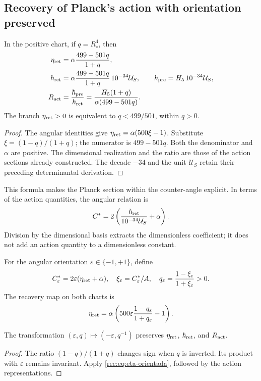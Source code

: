 \subsection{Recovery of Planck's action with orientation preserved}

\begin{theorem}
\label{rec:thm:accion}
In the positive chart, if \(q=R_\star^4\), then
\begin{align}
 \eta_{\rm ret}&=\alpha\frac{499-501q}{1+q},\label{rec:eq:eta-radio}\\
 \hbar_{\rm ret}&=\alpha\frac{499-501q}{1+q}\,10^{-34}\mathcal U_S,
 \qquad\hbar_{\rm pre}=H_5\,10^{-34}\mathcal U_S,\label{rec:eq:planck-radio}\\
 R_{\rm act}&=\frac{\hbar_{\rm pre}}{\hbar_{\rm ret}}
 =\frac{H_5(1+q)}{\alpha(499-501q)}.\label{rec:eq:ratio-radio}
\end{align}
The branch \(\eta_{\rm ret}>0\) is equivalent to \(q<499/501\), within \(q>0\).
\end{theorem}
\begin{proof}
The angular identities give \(\eta_{\rm ret}=\alpha(500\xi-1)\). Substitute \(\xi=(1-q)/(1+q)\); the numerator is \(499-501q\). Both the denominator and \(\alpha\) are positive. The dimensional realization and the ratio are those of the action sections already constructed. The decade \(-34\) and the unit \(\mathcal U_S\) retain their preceding determinantal derivation.
\end{proof}

This formula makes the Planck section within the counter-angle explicit. In terms of the action quantities, the angular relation is
\[
 C^*=2\left(\frac{\hbar_{\rm ret}}{10^{-34}\mathcal U_S}+\alpha\right).
\]
Division by the dimensional basis extracts the dimensionless coefficient; it does not add an action quantity to a dimensionless constant.

For the angular orientation \(\varepsilon\in\{-1,+1\}\), define
\[
 C^*_{\varepsilon}=2\varepsilon(\eta_{\rm ret}+\alpha),\quad
 \xi_\varepsilon=C^*_{\varepsilon}/A,\quad
 q_\varepsilon=\frac{1-\xi_\varepsilon}{1+\xi_\varepsilon}>0.
\]
The recovery map on both charts is
\begin{equation}
 \eta_{\rm ret}=\alpha\left(500\varepsilon
        \frac{1-q_\varepsilon}{1+q_\varepsilon}-1\right).
 \label{rec:eq:eta-orientada}
\end{equation}

\begin{corollary}
The transformation \((\varepsilon,q)\mapsto(-\varepsilon,q^{-1})\) preserves \(\eta_{\rm ret}\), \(\hbar_{\rm ret}\), and \(R_{\rm act}\).
\end{corollary}
\begin{proof}
The ratio \((1-q)/(1+q)\) changes sign when \(q\) is inverted. Its product with \(\varepsilon\) remains invariant. Apply \eqref{rec:eq:eta-orientada}, followed by the action representations.
\end{proof}

